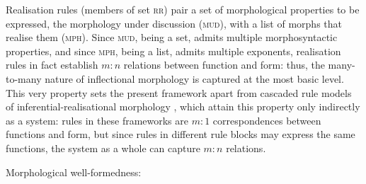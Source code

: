 \documentclass[output=paper
 	        ,biblatex
                ,babelshorthands
                ,newtxmath
                ,draftmode
                ,colorlinks, citecolor=brown
]{langscibook}
\begin{document}
\begin{exe}
\begin{xlist}
\begin{exe}
  \ex \label{ex:MudMS}

\end{exe}

Realisation rules (members of set \textsc{rr}) pair a set of
morphological properties to be expressed, the morphology under
discussion (\textsc{mud}), with a list of morphs that realise them
(\textsc{mph}). Since \textsc{mud}, being a set, admits multiple
morphosyntactic properties, and since \textsc{mph}, being a list,
admits multiple exponents, realisation rules in fact establish $m:n$
relations between function and form: thus, the many-to-many nature of
inflectional morphology is captured at the most basic level. This very
property sets the present framework apart from cascaded rule models of
inferential-realisational morphology \citep{Anderson92,Stump01}, which
attain this property only indirectly as a system: rules in these
frameworks are $m:1$ correspondences between functions and form, but
since rules in different rule blocks may express the same functions,
the system as a whole can capture $m:n$ relations.

\ea
\label{ex-MCC}
Morphological well-formedness:\\
\z


\end{xlist}
\end{exe}
\end{document}
